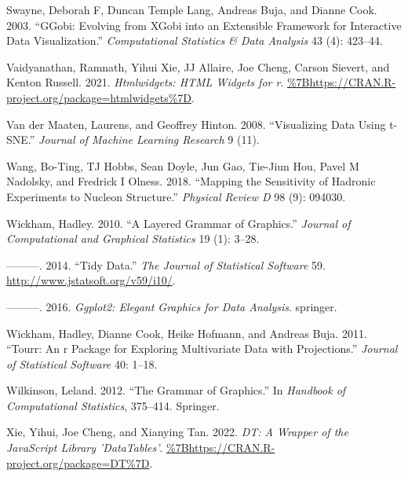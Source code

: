 \begin{CSLReferences}{1}{0}
\leavevmode{}%
Swayne, Deborah F, Duncan Temple Lang, Andreas Buja, and Dianne Cook. 2003. {``GGobi: Evolving from XGobi into an Extensible Framework for Interactive Data Visualization.''} \emph{Computational Statistics \& Data Analysis} 43 (4): 423--44.

\leavevmode{}%
Vaidyanathan, Ramnath, Yihui Xie, JJ Allaire, Joe Cheng, Carson Sievert, and Kenton Russell. 2021. \emph{Htmlwidgets: HTML Widgets for r}. \url{\%7Bhttps://CRAN.R-project.org/package=htmlwidgets\%7D}.

\leavevmode{}%
Van der Maaten, Laurens, and Geoffrey Hinton. 2008. {``Visualizing Data Using t-SNE.''} \emph{Journal of Machine Learning Research} 9 (11).

\leavevmode{}%
Wang, Bo-Ting, TJ Hobbs, Sean Doyle, Jun Gao, Tie-Jiun Hou, Pavel M Nadolsky, and Fredrick I Olness. 2018. {``Mapping the Sensitivity of Hadronic Experiments to Nucleon Structure.''} \emph{Physical Review D} 98 (9): 094030.

\leavevmode{}%
Wickham, Hadley. 2010. {``A Layered Grammar of Graphics.''} \emph{Journal of Computational and Graphical Statistics} 19 (1): 3--28.

\leavevmode{}%
---------. 2014. {``Tidy Data.''} \emph{The Journal of Statistical Software} 59. \url{http://www.jstatsoft.org/v59/i10/}.

\leavevmode{}%
---------. 2016. \emph{Ggplot2: Elegant Graphics for Data Analysis}. springer.

\leavevmode{}%
Wickham, Hadley, Dianne Cook, Heike Hofmann, and Andreas Buja. 2011. {``Tourr: An r Package for Exploring Multivariate Data with Projections.''} \emph{Journal of Statistical Software} 40: 1--18.

\leavevmode{}%
Wilkinson, Leland. 2012. {``The Grammar of Graphics.''} In \emph{Handbook of Computational Statistics}, 375--414. Springer.

\leavevmode{}%
Xie, Yihui, Joe Cheng, and Xianying Tan. 2022. \emph{DT: A Wrapper of the JavaScript Library 'DataTables'}. \url{\%7Bhttps://CRAN.R-project.org/package=DT\%7D}.

\end{CSLReferences}

